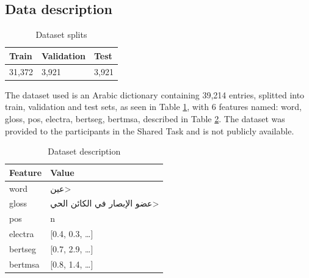 \documentclass[15pt]{article}
\begin{document}
\subsection{Data description}

\begin{table}[H]
    \centering
    \caption{Dataset splits}
    \label{table:dataset-splits}
    \renewcommand{\arraystretch}{1.5}%
    \begin{tabularx}{\textwidth}{|X|X|X|}
        \hline
        \textbf{Train} & \textbf{Validation} & \textbf{Test} \\
        \hline
        31,372 & 3,921 & 3,921 \\
        \hline
    \end{tabularx}
\end{table}

The dataset used is an Arabic dictionary containing 39,214 entries, splitted into train, validation and test sets, as seen in Table \ref{table:dataset-splits}, with 6 features named: word, gloss, pos, electra, bertseg, bertmsa, described in Table \ref{table:dataset-desc}. The dataset was provided to the participants in the Shared Task and is not publicly available.

\begin{table}[H]
    \centering
    \caption{Dataset description}
    \label{table:dataset-desc}
    \renewcommand{\arraystretch}{1.5}%
    \begin{tabularx}{\textwidth}{|l|X|}
        \hline
        \textbf{Feature} & \textbf{Value} \\
        \hline
        word & \<عين> \\
        \hline
        gloss & \<عضو الإبصار في الكائن الحي> \\
        \hline
        pos & n \\
        \hline
        electra & [0.4, 0.3, …] \\
        \hline
        bertseg & [0.7, 2.9, …] \\
        \hline
        bertmsa & [0.8, 1.4, …] \\
        \hline
    \end{tabularx}
\end{table}
\end{document}
